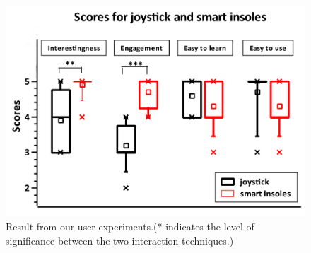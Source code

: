 \documentclass[review]{vgtc}                 %
\begin{document}
\begin{figure}
	\centering
	\includegraphics[width=\linewidth]{figs/scores.png}
	\caption{Result from our user experiments.(* indicates the level of significance between the two interaction techniques.)}
	\label{fig:final_scores}
\end{figure}


\end{document}
